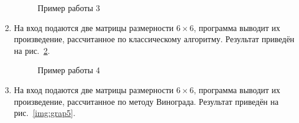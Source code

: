 \documentclass[12pt, a4paper]{article}
\begin{document}
\begin{enumerate}
\begin{figure}[h]
  		\caption{Пример работы 3}
  		\label{img:grap3}
	\end{figure}
	\newpage
	\item На вход подаются две матрицы размерности $6 \times 6$, 
	программа выводит их произведение, рассчитанное по классическому алгоритму.
	Результат приведён на рис.~\ref{img:grap4}.
	\begin{figure}[h]
  		\caption{Пример работы 4}
  		\label{img:grap4}
	\end{figure}
	\newpage
	\item На вход подаются две матрицы размерности $6 \times 6$, 
	программа выводит их произведение, рассчитанное по методу Винограда.
	Результат приведён на рис.~\ref{img:grap5}.	
	\begin{figure}[h]

\end{figure}
\end{enumerate}
\end{document}
